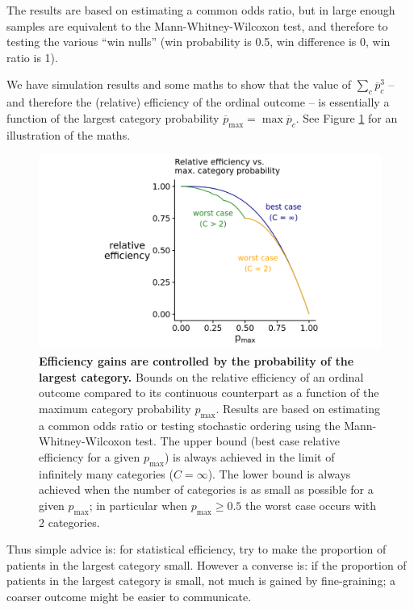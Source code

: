 \documentclass[
  11pt,
  fleqn
]{article}
\begin{document}
The results are based on estimating a common odds ratio, but in large
enough samples are equivalent to the Mann-Whitney-Wilcoxon test, and
therefore to testing the various ``win nulls'' (win probability is
  0.5, win difference
is 0, win ratio is 1).

We have simulation results and some maths to show that the value of $\sum_c
\overline p_c^3$ -- and therefore the (relative) efficiency of the
ordinal outcome -- is essentially a function of the largest category
probability $\overline{p}_{\max} = \max \overline{p}_c$. See Figure
\ref{fig:p_max} for an illustration of the maths.

\begin{figure}
  \includegraphics[width=6in]{p_max_controls_efficiency.png}
  \caption{\textbf{Efficiency gains are controlled by the probability
    of the largest category.} Bounds on the relative efficiency of an
    ordinal outcome
    compared to its continuous counterpart as a function of the maximum
    category probability $p_\text{max}$. Results are based on
    estimating a common odds ratio or testing stochastic ordering
    using the Mann-Whitney-Wilcoxon test. The upper bound (best case
    relative efficiency for a given $p_\text{max}$) is always
    achieved in the
    limit of infinitely many categories ($C = \infty$). The lower bound
    is always achieved when the number of categories is as small as
    possible for a given $p_\text{max}$; in particular when
  $p_\text{max} \geq 0.5$ the worst case occurs with 2 categories.}
  \label{fig:p_max}
\end{figure}

Thus simple advice is: for statistical efficiency, try to make
the proportion
of patients in the largest category small. However a converse is: if the
proportion of patients in the largest category is small, not much
is gained by
fine-graining; a coarser outcome might be easier to communicate.
\end{document}
